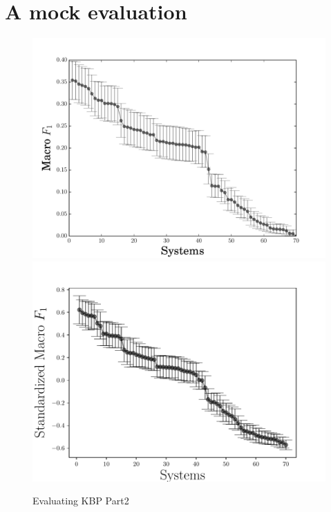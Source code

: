 \section{A mock evaluation}
\label{sec:evaluation}

\begin{figure}
  \includegraphics[width=\columnwidth]{figures/experiment1}
  \includegraphics[width=\columnwidth]{figures/experiment3}
  \caption{Evaluating KBP Part2}
\end{figure}
